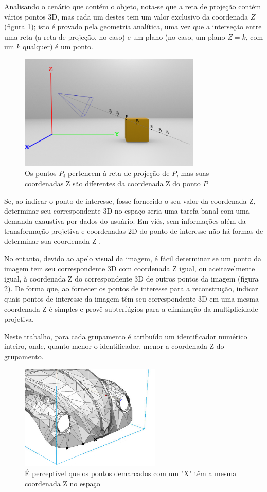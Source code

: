 	Analisando o cenário que contém o objeto, nota-se que a reta de projeção contém vários pontos 3D, mas cada um destes tem um valor exclusivo da coordenada $Z$ (figura \ref{imagemUnicoPontoPorPlano}); isto é provado pela geometria analítica, uma vez que a interseção entre uma reta (a reta de projeção, no caso) e um plano (no caso, um plano $Z = k$, com um $k$ qualquer) é um ponto.
	
	\begin{figure}[!htb]
		\centering
		\includegraphics[height=5.5cm]{imagens/cenaExemploUnicoPontoPorPlano.png}
		\caption{Os pontos $P_i$ pertencem à reta de projeção de $P$, mas suas coordenadas Z são diferentes da coordenada Z do ponto $P$}
		\label{imagemUnicoPontoPorPlano}
	\end{figure}
	
	Se, ao indicar o ponto de interesse, fosse fornecido o seu valor da coordenada Z, determinar seu correspondente 3D no espaço seria uma tarefa banal com uma demanda exaustiva por dados do usuário. Em viés, sem informações além da transformação projetiva e coordenadas 2D do ponto de interesse não há formas de determinar sua coordenada Z \cite{foto3D}.
	
	No entanto, devido ao apelo visual da imagem, é fácil determinar se um ponto da imagem tem seu correspondente 3D com coordenada Z igual, ou aceitavelmente igual, à coordenada Z do correspondente 3D de outros pontos da imagem (figura \ref{imagemPontosMesmoPlano}). De forma que, ao fornecer os pontos de interesse para a reconstrução, indicar quais pontos de interesse da imagem têm seu correspondente 3D em uma mesma coordenada Z é simples e provê subterfúgios para a eliminação da multiplicidade projetiva.
	
	Neste trabalho, para cada grupamento é atribuído um identificador numérico inteiro, onde, quanto menor o identificador, menor a coordenada Z do grupamento.
	
	\begin{figure}[!htb]
		\centering
		\includegraphics[height=5cm]{imagens/pontosMesmoPlano.png}
		\caption{É perceptível que os pontos demarcados com um "X" têm a mesma coordenada Z no espaço}
		\label{imagemPontosMesmoPlano}
	\end{figure}
	

